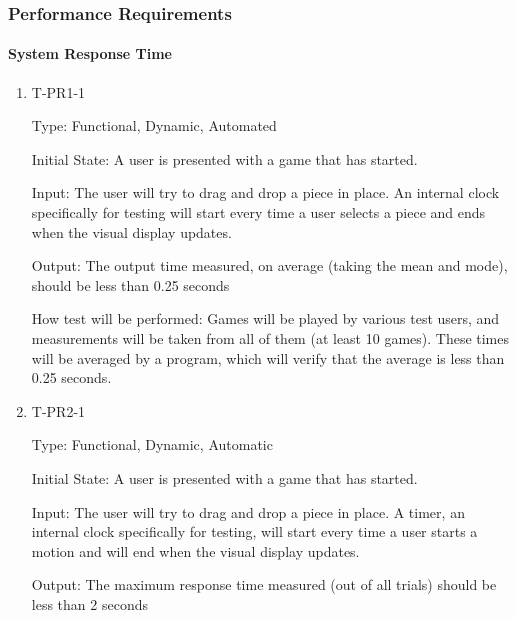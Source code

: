 \documentclass[12pt, titlepage]{article}
\begin{document}
\subsubsection{Performance Requirements}

    \paragraph{System Response Time}

        \begin{enumerate}
    
            \item{T-PR1-1\\}
            
                Type: Functional, Dynamic, Automated
                					
                Initial State: A user is presented with a game that has started.
                					
                Input: The user will try to drag and drop a piece in place. An
                internal clock specifically for testing will start every time a user selects a piece and ends when the visual display updates.
                					
                Output: The output time measured, on average (taking the mean and mode), should be less than 0.25 seconds
                					
                How test will be performed: Games will be played by various test users, and measurements will be taken from all of them (at least 10 games). These times will be averaged by a program, which will verify that the average is less than 0.25 seconds.
            
            \item{T-PR2-1\\}
            
                Type: Functional, Dynamic, Automatic
                					
                Initial State: A user is presented with a game that has started.
                					
                Input: The user will try to drag and drop a piece in place. A timer, an
                internal clock specifically for testing, will start every time a user starts a motion and will end when the visual display updates.
                					
                Output: The maximum response time measured (out of all trials) should be less than 2 seconds
                					

\end{enumerate}
\end{document}
